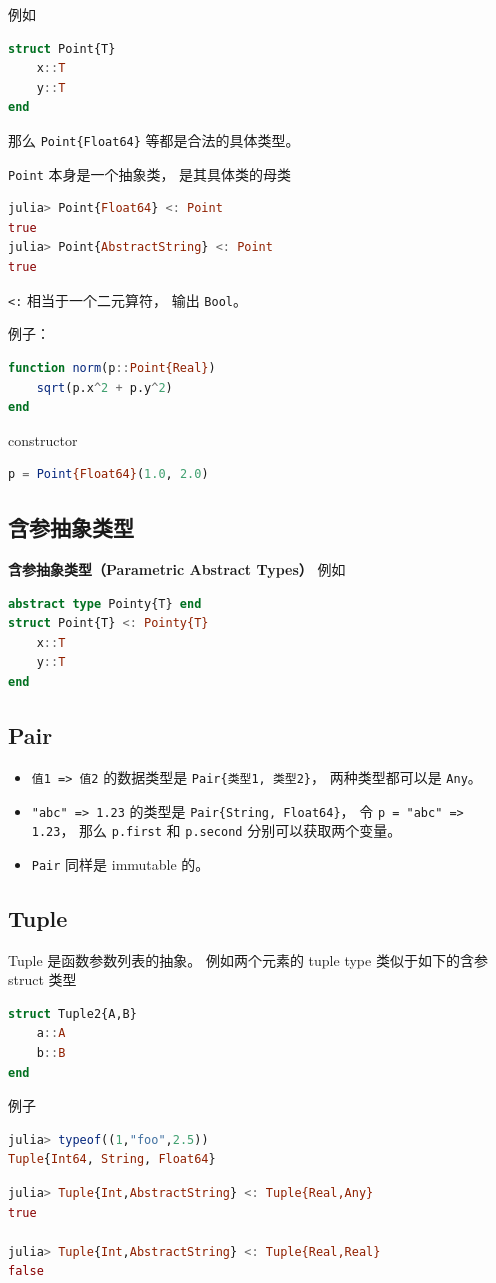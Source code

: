 例如
\begin{lstlisting}[language=julia]
struct Point{T}
    x::T
    y::T
end
\end{lstlisting}
那么 \verb`Point{Float64}` 等都是合法的具体类型。

\verb`Point` 本身是一个抽象类， 是其具体类的母类
\begin{lstlisting}[language=julia]
julia> Point{Float64} <: Point
true
julia> Point{AbstractString} <: Point
true
\end{lstlisting}
\verb`<:` 相当于一个二元算符， 输出 \verb`Bool`。

例子：
\begin{lstlisting}[language=julia]
function norm(p::Point{Real})
    sqrt(p.x^2 + p.y^2)
end
\end{lstlisting}
constructor
\begin{lstlisting}[language=julia]
p = Point{Float64}(1.0, 2.0)
\end{lstlisting}

\subsection{含参抽象类型}
\textbf{含参抽象类型（Parametric Abstract Types）}
例如
\begin{lstlisting}[language=julia]
abstract type Pointy{T} end
struct Point{T} <: Pointy{T}
    x::T
    y::T
end
\end{lstlisting}


\subsection{Pair}
\begin{itemize}
\item \verb`值1 => 值2` 的数据类型是 \verb`Pair{类型1, 类型2}`， 两种类型都可以是 \verb`Any`。
\item \verb`"abc" => 1.23` 的类型是 \verb`Pair{String, Float64}`， 令 \verb`p = "abc" => 1.23`， 那么 \verb`p.first` 和 \verb`p.second` 分别可以获取两个变量。
\item \verb`Pair` 同样是 immutable 的。
\end{itemize}


\subsection{Tuple}
Tuple 是函数参数列表的抽象。 例如两个元素的 tuple type 类似于如下的含参 struct 类型
\begin{lstlisting}[language=julia]
struct Tuple2{A,B}
    a::A
    b::B
end
\end{lstlisting}
例子
\begin{lstlisting}[language=julia]
julia> typeof((1,"foo",2.5))
Tuple{Int64, String, Float64}
\end{lstlisting}
\begin{lstlisting}[language=julia]
julia> Tuple{Int,AbstractString} <: Tuple{Real,Any}
true

julia> Tuple{Int,AbstractString} <: Tuple{Real,Real}
false
\end{lstlisting}

